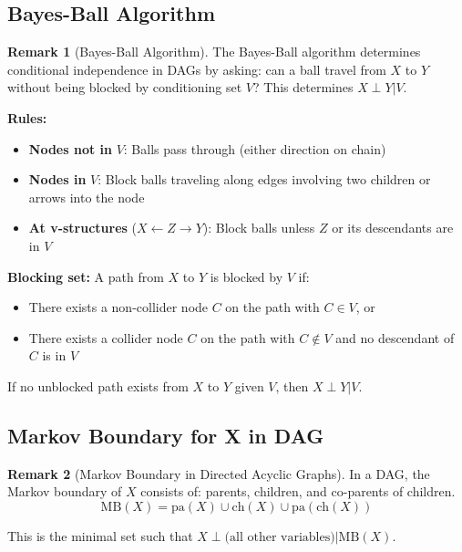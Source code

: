 \documentclass[12pt,a4paper]{article}
\theoremstyle{definition}
\newtheorem{remark}{Remark}[section]
\begin{document}
\subsection{Bayes-Ball Algorithm}

\begin{remark}[Bayes-Ball Algorithm]
The Bayes-Ball algorithm determines conditional independence in DAGs by asking: can a ball travel from $X$ to $Y$ without being blocked by conditioning set $V$? This determines $X \perp Y | V$.

\textbf{Rules:}
\begin{itemize}
    \item \textbf{Nodes not in } $V$: Balls pass through (either direction on chain)
    
    \item \textbf{Nodes in } $V$: Block balls traveling along edges involving two children or arrows into the node
    
    \item \textbf{At v-structures} ($X \leftarrow Z \rightarrow Y$): Block balls unless $Z$ or its descendants are in $V$
\end{itemize}

\textbf{Blocking set:} A path from $X$ to $Y$ is blocked by $V$ if:
\begin{itemize}
    \item There exists a non-collider node $C$ on the path with $C \in V$, or
    \item There exists a collider node $C$ on the path with $C \notin V$ and no descendant of $C$ is in $V$
\end{itemize}

If no unblocked path exists from $X$ to $Y$ given $V$, then $X \perp Y | V$.
\end{remark}

\subsection{Markov Boundary for X in DAG}

\begin{remark}[Markov Boundary in Directed Acyclic Graphs]
In a DAG, the Markov boundary of $X$ consists of: parents, children, and co-parents of children.
\[
\text{MB}(X) = \text{pa}(X) \cup \text{ch}(X) \cup \text{pa}(\text{ch}(X))
\]

This is the minimal set such that $X \perp \text{(all other variables)} | \text{MB}(X)$.
\end{remark}
\end{document}
